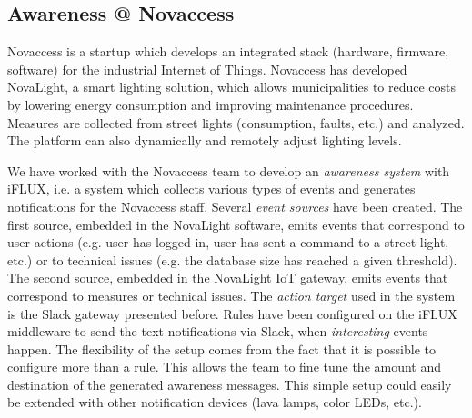 \subsection{Awareness @ Novaccess}

Novaccess is a startup which develops an integrated stack (hardware, firmware, software) for the industrial Internet of Things. Novaccess has developed NovaLight, a smart lighting solution, which allows municipalities to reduce costs by lowering energy consumption and improving maintenance procedures. Measures are collected from street lights (consumption, faults, etc.) and analyzed. The platform can also dynamically and remotely adjust lighting levels.


We have worked with the Novaccess team to develop an \emph{awareness system} with iFLUX, i.e. a system which collects various types of events and generates notifications for the Novaccess staff. Several \emph{event sources} have been created. The first source, embedded in the NovaLight software, emits events that correspond to user actions (e.g. user has logged in, user has sent a command to a street light, etc.) or to technical issues (e.g. the database size has reached a given threshold). The second source, embedded in the NovaLight IoT gateway, emits events that correspond to measures or technical issues. The \emph{action target} used in the system is the Slack gateway presented before. Rules have been configured on the iFLUX middleware to send the text notifications via Slack, when \emph{interesting} events happen. The flexibility of the setup comes from the fact that it is possible to configure more than a rule. This allows the team to fine tune the amount and destination of the generated awareness messages. This simple setup could easily be extended with other notification devices (lava lamps, color LEDs, etc.).


